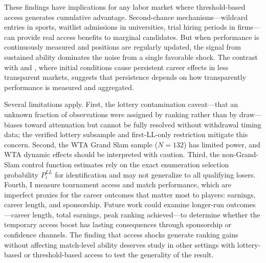 These findings have implications for any labor market where threshold-based access generates cumulative advantage. Second-chance mechanisms---wildcard entries in sports, waitlist admissions in universities, trial hiring periods in firms---can provide real access benefits to marginal candidates. But when performance is continuously measured and positions are regularly updated, the signal from sustained ability dominates the noise from a single favorable shock. The contrast with \citet{Oyer2006_initial_placement} and \citet{Oreopoulos2012_graduating_recession}, where initial conditions cause persistent career effects in less transparent markets, suggests that persistence depends on how transparently performance is measured and aggregated.

Several limitations apply. First, the lottery contamination caveat---that an unknown fraction of observations were assigned by ranking rather than by draw---biases toward attenuation but cannot be fully resolved without withdrawal timing data; the verified lottery subsample and first-LL-only restriction mitigate this concern. Second, the WTA Grand Slam sample ($N = 132$) has limited power, and WTA dynamic effects should be interpreted with caution. Third, the non-Grand-Slam control function estimates rely on the exact enumeration selection probability $P_i^{LL}$ for identification and may not generalize to all qualifying losers. Fourth, I measure tournament access and match performance, which are imperfect proxies for the career outcomes that matter most to players: earnings, career length, and sponsorship. Future work could examine longer-run outcomes---career length, total earnings, peak ranking achieved---to determine whether the temporary access boost has lasting consequences through sponsorship or confidence channels. The finding that access shocks generate ranking gains without affecting match-level ability deserves study in other settings with lottery-based or threshold-based access to test the generality of the result.
